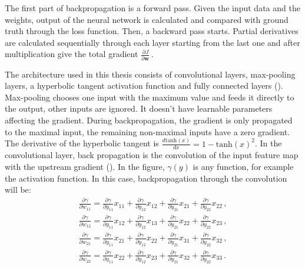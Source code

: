 The first part of backpropagation is a forward pass. Given the input data and the weights, output of the neural network is calculated and compared with ground truth through the loss function. Then, a backward pass starts. Partial derivatives are calculated sequentially through each layer starting from the last one and after multiplication give the total gradient $\frac{\partial J}{\partial \textbf{w}}$\,.

The architecture used in this thesis consists of convolutional layers, max-pooling layers, a hyperbolic tangent activation function and fully connected layers (). Max-pooling chooses one input with the maximum value and feeds it directly to the output, other inputs are ignored. It doesn't have learnable parameters affecting the gradient. During backpropagation, the gradient is only propagated to the maximal input, the remaining non-maximal inputs have a zero gradient. The derivative of the hyperbolic tangent is $\frac{d\textrm{tanh}(x)}{dx} = 1-\textrm{tanh}(x)^2$. In the convolutional layer, back propagation is the convolution of the input feature map with the upstream gradient (). In the figure, $\gamma(y)$ is any function, for example the activation function. In this case, backpropagation through the convolution will be:
\begin{equation}
\begin{aligned}
	\frac{\partial \gamma}{\partial w_{11}} = \frac{\partial\gamma}{\partial y_{11}} x_{11} + \frac{\partial\gamma}{\partial y_{12}} x_{12} + \frac{\partial\gamma}{\partial y_{21}} x_{21} + \frac{\partial\gamma}{\partial y_{22}} x_{22}\,, \\
	\frac{\partial \gamma}{\partial w_{12}} = \frac{\partial\gamma}{\partial y_{11}} x_{12} + \frac{\partial\gamma}{\partial y_{12}} x_{13} + \frac{\partial\gamma}{\partial y_{21}} x_{22} + \frac{\partial\gamma}{\partial y_{22}} x_{23}\,, \\
	\frac{\partial \gamma}{\partial w_{21}} = \frac{\partial\gamma}{\partial y_{11}} x_{21} + \frac{\partial\gamma}{\partial y_{12}} x_{22} + \frac{\partial\gamma}{\partial y_{21}} x_{31} + \frac{\partial\gamma}{\partial y_{22}} x_{32}\,, \\
	\frac{\partial \gamma}{\partial w_{22}} = \frac{\partial\gamma}{\partial y_{11}} x_{22} + \frac{\partial\gamma}{\partial y_{12}} x_{23} + \frac{\partial\gamma}{\partial y_{21}} x_{32} + \frac{\partial\gamma}{\partial y_{22}} x_{33}\,.
\end{aligned}
\end{equation}

